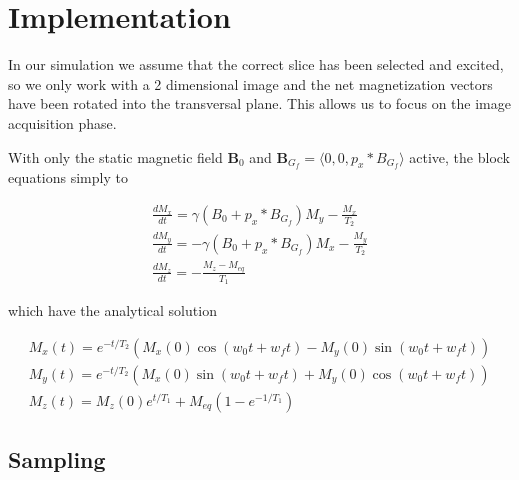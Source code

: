\section{Implementation}



In our simulation we assume that the correct slice has been selected
and excited, so we only work with a 2 dimensional image and the net
magnetization vectors have been rotated into the transversal
plane. This allows us to focus on the image acquisition phase.


With only the static magnetic field $\mathbf{B}_0$ and
$\mathbf{B}_{G_f} = \langle 0, 0, p_x * B_{G_f} \rangle$ active, the
block equations simply to

\begin{displaymath}
  \begin{array}{l}
    \frac{dM_x}{dt} = \gamma (B_0 + p_x * B_{G_f}) M_y - \frac{M_x}{T_2} \\
    \frac{dM_y}{dt} = - \gamma (B_0 + p_x * B_{G_f}) M_x - \frac{M_y}{T_2} \\
    \frac{dM_z}{dt} = - \frac{M_z - M_{eq}}{T_1}
  \end{array}
\end{displaymath}

which have the analytical solution 

\begin{displaymath}
  \begin{array}{l}
    M_x(t) = e^{-t/T_2}(M_x(0) \cos(w_0 t + w_f t) - M_y(0) \sin (w_0 t + w_f t)) \\
    M_y(t) = e^{-t/T_2}(M_x(0) \sin(w_0 t + w_f t) + M_y(0) \cos (w_0 t + w_f t)) \\
    M_z(t) = M_z(0) e^{t/T_1} + M_{eq}(1 - e^{-1/T_1})
  \end{array}
\end{displaymath}



\subsection{Sampling}

